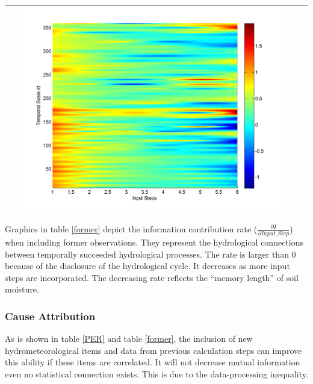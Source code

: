 \documentclass[11pt]{article}
\begin{document}
\begin{table}[H]
{\begin{tabular}{cccc}
&\begin{minipage}{.3\textwidth}\includegraphics[width=\linewidth]{resultgraph/06810000qdiff_former.png}\end{minipage}
\\
\bottomrule
\end{tabular}
}
\end{table}

Graphics in table \ref{former} depict the information contribution rate ($\frac{\partial I}{\partial Input\_Step}$) when including former observations. They represent the hydrological connections between temporally succeeded hydrological processes. The rate is larger than 0 because of the disclosure of the hydrological cycle. It decreases as more input steps are incorporated. The decreasing rate reflects the ``memory length'' of soil moisture.  





 
\subsubsection{Cause Attribution}

As is shown in table \ref{PER} and table \ref{former}, the inclusion of new hydrometeorological items and data from previous calculation steps can improve this ability if these items are correlated. It will not decrease mutual information even no statistical connection exists. This is due to the data-processing inequality\cite{cover2012elements}.  
\end{document}
